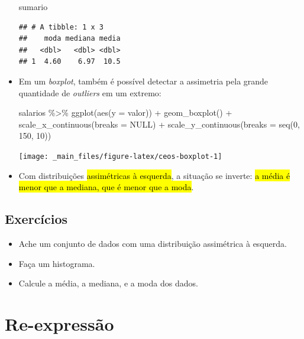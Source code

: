 \documentclass[
  11pt]{report}
\newenvironment{Shaded}{\begin{snugshade}}{\end{snugshade}}
\newcommand{\AttributeTok}[1]{\textcolor[rgb]{0.77,0.63,0.00}{#1}}
\newcommand{\ConstantTok}[1]{\textcolor[rgb]{0.00,0.00,0.00}{#1}}
\newcommand{\DecValTok}[1]{\textcolor[rgb]{0.00,0.00,0.81}{#1}}
\newcommand{\FunctionTok}[1]{\textcolor[rgb]{0.00,0.00,0.00}{#1}}
\newcommand{\NormalTok}[1]{#1}
\newcommand{\SpecialCharTok}[1]{\textcolor[rgb]{0.00,0.00,0.00}{#1}}
\renewenvironment{Shaded}{
    \begin{mdframed}[%
      roundcorner=2pt,%
      innerleftmargin=5pt,%
      innerrightmargin=5pt,%
      topline=true,%
      leftline=true,%
      rightline=true,%
      bottomline=true,%
      linewidth=0.5pt,%
      linecolor=black!20,%
      backgroundcolor=black!2,%
      skipabove=2ex,%
      skipbelow=2.5ex%
    ]%
  }
  {
    \end{mdframed}
  }
\begin{document}
\begin{itemize}
\begin{Shaded}
\begin{Highlighting}[]
\NormalTok{sumario}
\end{Highlighting}
\end{Shaded}

\begin{verbatim}
## # A tibble: 1 x 3
##    moda mediana media
##   <dbl>   <dbl> <dbl>
## 1  4.60    6.97  10.5
\end{verbatim}
\item
  Em um \emph{boxplot}, também é possível detectar a assimetria pela grande quantidade de \emph{outliers} em um extremo:

\begin{Shaded}
\begin{Highlighting}[]
\NormalTok{salarios }\SpecialCharTok{\%\textgreater{}\%} 
  \FunctionTok{ggplot}\NormalTok{(}\FunctionTok{aes}\NormalTok{(}\AttributeTok{y =}\NormalTok{ valor)) }\SpecialCharTok{+}
    \FunctionTok{geom\_boxplot}\NormalTok{() }\SpecialCharTok{+}
    \FunctionTok{scale\_x\_continuous}\NormalTok{(}\AttributeTok{breaks =} \ConstantTok{NULL}\NormalTok{) }\SpecialCharTok{+}
    \FunctionTok{scale\_y\_continuous}\NormalTok{(}\AttributeTok{breaks =} \FunctionTok{seq}\NormalTok{(}\DecValTok{0}\NormalTok{, }\DecValTok{150}\NormalTok{, }\DecValTok{10}\NormalTok{))}
\end{Highlighting}
\end{Shaded}

  \begin{center}\texttt{[image: \_main\_files/figure-latex/ceos-boxplot-1]} \end{center}
\item
  Com distribuições {\hl{assimétricas à esquerda}}, a situação se inverte: {\hl{a média é menor que a mediana, que é menor que a moda}}.
\end{itemize}

\hypertarget{exercuxedcios-8}{%
\subsection{Exercícios}\label{exercuxedcios-8}}

\begin{itemize}
\item
  Ache um conjunto de dados com uma distribuição assimétrica à esquerda.
\item
  Faça um histograma.
\item
  Calcule a média, a mediana, e a moda dos dados.
\end{itemize}

\hypertarget{re-expressuxe3o}{%
\section{Re-expressão}\label{re-expressuxe3o}}
\end{document}
